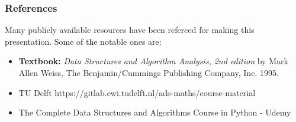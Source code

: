 \begin{frame}\frametitle{References}
Many publicly available resources have been refereed for making this presentation. Some of the notable ones are:
\footnotesize
\begin{itemize}
\item {\bf Textbook: }
{\em Data Structures and Algorithm Analysis, 2nd edition} by Mark Allen Weiss,
The Benjamin/Cummings Publishing Company, Inc.
1995. 
\item TU Delft https://gitlab.ewi.tudelft.nl/ads-maths/course-material 
\item The Complete Data Structures and Algorithms Course in Python - Udemy
\end{itemize}
\end{frame}
